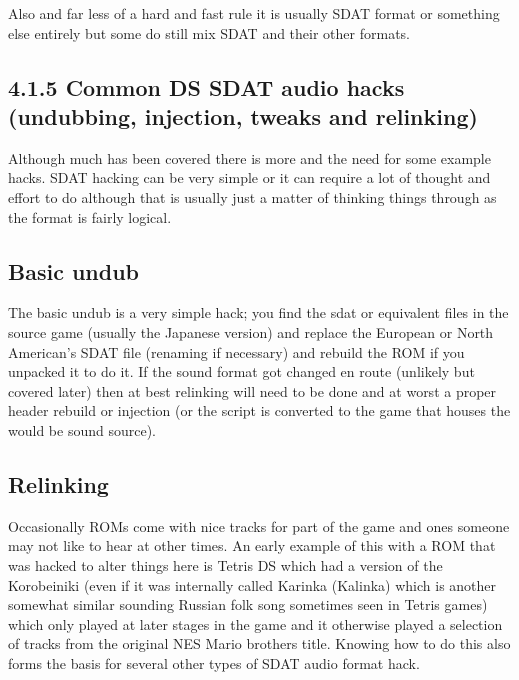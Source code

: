 \documentclass[
]{book}
\begin{document}
Also and far less of a hard and fast rule it is usually SDAT format or something else entirely but some do still mix SDAT and their other formats.

\hypertarget{common-ds-sdat-audio-hacks-undubbing-injection-tweaks-and-relinking}{%
\subsection{4.1.5 Common DS SDAT audio hacks (undubbing, injection, tweaks and relinking)}\label{common-ds-sdat-audio-hacks-undubbing-injection-tweaks-and-relinking}}

Although much has been covered there is more and the need for some example hacks. SDAT hacking can be very simple or it can require a lot of thought and effort to do although that is usually just a matter of thinking things through as the format is fairly logical.

\hypertarget{basic-undub}{%
\subsection{Basic undub}\label{basic-undub}}

The basic undub is a very simple hack; you find the sdat or equivalent files in the source game (usually the Japanese version) and replace the European or North American's SDAT file (renaming if necessary) and rebuild the ROM if you unpacked it to do it. If the sound format got changed en route (unlikely but covered later) then at best relinking will need to be done and at worst a proper header rebuild or injection (or the script is converted to the game that houses the would be sound source).

\hypertarget{relinking}{%
\subsection{Relinking}\label{relinking}}

Occasionally ROMs come with nice tracks for part of the game and ones someone may not like to hear at other times. An early example of this with a ROM that was hacked to alter things here is Tetris DS which had a version of the Korobeiniki (even if it was internally called Karinka (Kalinka) which is another somewhat similar sounding Russian folk song sometimes seen in Tetris games) which only played at later stages in the game and it otherwise played a selection of tracks from the original NES Mario brothers title. Knowing how to do this also forms the basis for several other types of SDAT audio format hack.
\end{document}
